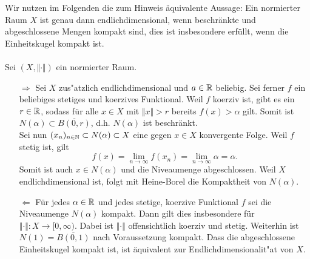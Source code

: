 
Wir nutzen im Folgenden die zum Hinweis äquivalente Aussage: Ein normierter Raum $X$ ist genau dann endlichdimensional, wenn beschränkte und abgeschlossene Mengen kompakt sind,
dies ist insbesondere erfüllt, wenn die Einheitskugel kompakt ist.
\\\\
Sei $(X,\Vert\cdot\Vert)$ ein normierter Raum.\\
\begin{itemize}
 \item [$\Rightarrow$] Sei $X$ zus"atzlich endlichdimensional und $a\in\mathbb{R}$ beliebig.
 Sei ferner $f$ ein beliebiges stetiges und koerzives Funktional.
 Weil $f$ koerziv ist, gibt es ein 
 $r\in\mathbb{R}$, sodass für alle $x\in X$ mit $\Vert x\Vert>r$ bereits $f(x)>\alpha$ gilt. Somit ist $N(\alpha) \subset \overline{B(0,r)}$,
 d.h. $N(\alpha)$ ist beschränkt.\\
 Sei nun $(x_n)_{n\in\mathbb{N}}\subset N(\alpha)\subset X$ eine gegen $x\in X$ konvergente Folge. Weil $f$ stetig ist, gilt
 \begin{displaymath}
  f(x)=\lim_{n\to\infty} f(x_n) =\lim_{n\to\infty} \alpha =\alpha.
 \end{displaymath}
Somit ist auch $x\in N(\alpha)$ und die Niveaumenge abgeschlossen. Weil $X$ endlichdimensional ist, folgt mit Heine-Borel die Kompaktheit von $N(\alpha)$.\\
\item [$\Leftarrow$] Für jedes $\alpha\in \mathbb{R}$ und jedes stetige, koerzive Funktional $f$ sei die Niveaumenge $N(\alpha)$ kompakt. Dann gilt
dies insbesondere für $\Vert\cdot\Vert: X\to [0,\infty)$.
Dabei ist $\Vert\cdot\Vert$ offensichtlich koerziv und stetig. Weiterhin ist $N(1)=\overline{B(0,1)}$ nach Voraussetzung kompakt.
Dass die abgeschlossene Einheitskugel kompakt ist, ist äquivalent zur Endlichdimensionalit"at von $X$.
\end{itemize}
